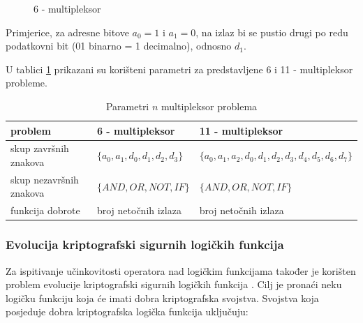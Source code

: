 \begin{figure}[H]
\centering
{}
\label{muxPicture}
\caption{6 - multipleksor}
\end{figure}

Primjerice, za adresne bitove $a_0=1$ i $a_1=0$, na izlaz bi se pustio drugi po redu podatkovni bit (01 binarno = 1 decimalno), odnosno $d_1$.

U tablici \ref{muxTable} prikazani su korišteni parametri za predstavljene 6 i 11 - multipleksor probleme.

\begin{table}[H]
 	\centering

    \begin{tabular}{| l | l | l |}
    \hline
   problem & 6 - multipleksor & 11 - multipleksor \\ \hline
   skup završnih znakova & $\{a_0, a_1, d_0, d_1, d_2, d_3 \}$ & $\{a_0, a_1, a_2, d_0, d_1, d_2, d_3, d_4, d_5, d_6, d_7 \}$\\ \hline
   skup nezavršnih znakova & $\{ AND, OR, NOT, IF \}$  & $\{ AND, OR, NOT, IF \}$ \\ \hline
   funkcija dobrote & broj netočnih izlaza & broj netočnih izlaza \\ \hline
    \end{tabular}
    
    \caption{Parametri $n$ multipleksor problema}
    \label{muxTable}
\end{table}

\subsubsection{Evolucija kriptografski sigurnih logičkih funkcija}
Za ispitivanje učinkovitosti operatora nad logičkim funkcijama također je korišten problem evolucije kriptografski sigurnih logičkih funkcija \cite{bool}. Cilj je pronaći neku logičku funkciju koja će imati dobra kriptografska svojstva. Svojstva koja posjeduje dobra kriptografska logička funkcija uključuju:

